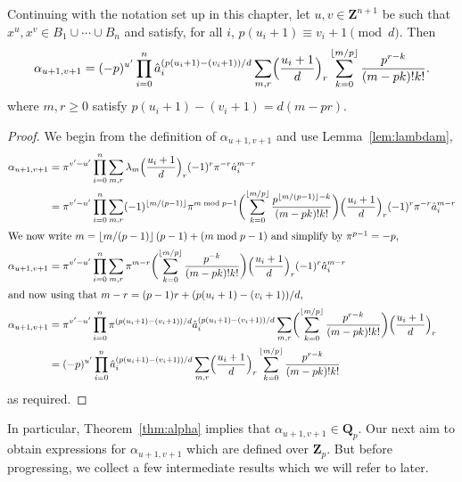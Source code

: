 \begin{thm} \label{thm:alpha}
Continuing with the notation set up in this chapter, let 
$u, v \in \mathbf{Z}^{n+1}$ be such that 
$x^u, x^v \in B_1 \cup \dotsb \cup B_n$ and satisfy, 
for all $i$, $p (u_i + 1) \equiv v_i + 1 \pmod{d}$. 
Then 
\begin{equation*}
\alpha_{u+1,v+1} = (-p)^{u'} \prod_{i=0}^n 
    \hat{a}_i^{(p (u_i + 1) - (v_i + 1))/d} \sum_{m,r} 
    \Bigl(\frac{u_i+1}{d}\Bigr)_r 
    \sum_{k=0}^{\left\lfloor m/p\right\rfloor} \frac{p^{r-k}}{(m-pk)! k!}.
\end{equation*}
where $m, r \geq 0$ satisfy $p (u_i + 1) - (v_i + 1) = d (m - pr)$. 
\end{thm}

\begin{proof}
We begin from the definition of $\alpha_{u+1,v+1}$ 
and use Lemma~\ref{lem:lambdam},
\begin{align*}
\alpha_{u+1,v+1} 
    & = \pi^{v'-u'} \prod_{i=0}^n \sum_{m,r} \lambda_m \Bigl( \frac{u_i+1}{d} \Bigr)_r (-1)^r \pi^{-r} \hat{a}_i^{m-r} \\
    & = \pi^{v'-u'} \prod_{i=0}^n \sum_{m,r} (-1)^{\left\lfloor m/(p-1)\right\rfloor} \pi^{m \bmod{p-1}} \biggl( \sum_{k=0}^{\left\lfloor m/p\right\rfloor} \frac{p^{\left\lfloor m/(p-1)\right\rfloor-k}}{(m-pk)!k!} \biggr) \Bigl( \frac{u_i+1}{d} \Bigr)_r (-1)^r \pi^{-r} \hat{a}_i^{m-r} \\
\intertext{We now write $m = \left\lfloor m/(p-1)\right\rfloor (p-1) + (m \bmod{p-1})$ and simplify by $\pi^{p-1} = -p$,}
\alpha_{u+1,v+1}
    & = \pi^{v'-u'} \prod_{i=0}^n \sum_{m,r} \pi^{m - r} \biggl( \sum_{k=0}^{\left\lfloor m/p\right\rfloor} \frac{p^{-k}}{(m-pk)!k!} \biggr) \Bigl( \frac{u_i+1}{d} \Bigr)_r (-1)^r \hat{a}_i^{m-r} \\
\intertext{and now using that $m-r = (p-1)r + (p(u_i+1) - (v_i+1))/d$,}
\alpha_{u+1,v+1}
    & = \pi^{v'-u'} \prod_{i=0}^n \pi^{(p (u_i + 1) - (v_i + 1))/d} \hat{a}_i^{(p (u_i + 1) - (v_i + 1))/d} \sum_{m,r} \biggl( \sum_{k=0}^{\left\lfloor m/p\right\rfloor} \frac{p^{r-k}}{(m-pk)!k!} \biggr) \Bigl( \frac{u_i+1}{d} \Bigr)_r \\
    & = (-p)^{u'} \prod_{i=0}^n \hat{a}_i^{(p (u_i + 1) - (v_i + 1))/d} \sum_{m,r} \Bigl( \frac{u_i+1}{d} \Bigr)_r \sum_{k=0}^{\left\lfloor m/p\right\rfloor} \frac{p^{r-k}}{(m-pk)!k!}
\end{align*}
as required.
\end{proof}

In particular, Theorem~\ref{thm:alpha} implies that 
$\alpha_{u+1, v+1} \in \mathbf{Q}_p$.  Our next aim to obtain 
expressions for $\alpha_{u+1,v+1}$ which are defined over 
$\mathbf{Z}_p$.  But before progressing, we collect a few 
intermediate results which we will refer to later.

